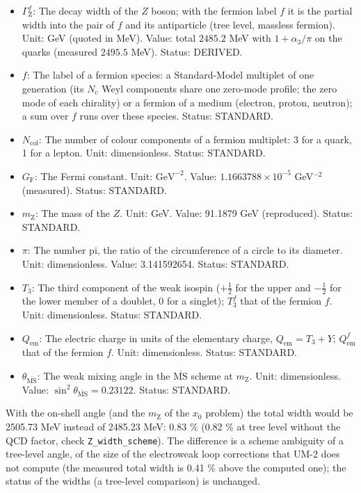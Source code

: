\documentclass[
  10pt,
]{article}
\providecommand{\tightlist}{%
  \setlength{\itemsep}{0pt}\setlength{\parskip}{0pt}}
\begin{document}
\begin{itemize}
\tightlist
\item
  \(\Gamma_{\mathrm{Z}}^{f}\): The decay width of the \(Z\) boson; with
  the fermion label \(f\) it is the partial width into the pair of \(f\)
  and its antiparticle (tree level, massless fermion). Unit: GeV (quoted
  in MeV). Value: total \(2485.2\) MeV with \(1 + \alpha_3/\pi\) on the
  quarks (measured \(2495.5\) MeV). Status: DERIVED.
\item
  \(f\): The label of a fermion species: a Standard-Model multiplet of
  one generation (its \(N_{\mathrm{c}}\) Weyl components share one
  zero-mode profile; the zero mode of each chirality) or a fermion of a
  medium (electron, proton, neutron); a sum over \(f\) runs over these
  species. Status: STANDARD.
\item
  \(N_{\mathrm{col}}\): The number of colour components of a fermion
  multiplet: 3 for a quark, 1 for a lepton. Unit: dimensionless. Status:
  STANDARD.
\item
  \(G_{\mathrm{F}}\): The Fermi constant. Unit: \(\mathrm{GeV}^{-2}\).
  Value: \(1.1663788\times10^{-5}\) GeV\(^{-2}\) (measured). Status:
  STANDARD.
\item
  \(m_{\mathrm{Z}}\): The mass of the \(Z\). Unit: GeV. Value: 91.1879
  GeV (reproduced). Status: STANDARD.
\item
  \(\pi\): The number pi, the ratio of the circumference of a circle to
  its diameter. Unit: dimensionless. Value: 3.141592654. Status:
  STANDARD.
\item
  \(T_3\): The third component of the weak isospin (\(+\frac12\) for the
  upper and \(-\frac12\) for the lower member of a doublet, 0 for a
  singlet); \(T_3^f\) that of the fermion \(f\). Unit: dimensionless.
  Status: STANDARD.
\item
  \(Q_{\mathrm{em}}\): The electric charge in units of the elementary
  charge, \(Q_{\mathrm{em}} = T_3 + Y\); \(Q^f_{\mathrm{em}}\) that of
  the fermion \(f\). Unit: dimensionless. Status: STANDARD.
\item
  \(\theta_{\overline{\mathrm{MS}}}\): The weak mixing angle in the
  \(\overline{\mathrm{MS}}\) scheme at \(m_{\mathrm{Z}}\). Unit:
  dimensionless. Value:
  \(\sin^2\theta_{\overline{\mathrm{MS}}} = 0.23122\). Status: STANDARD.
\end{itemize}

With the on-shell angle (and the \(m_{\mathrm{Z}}\) of the \(x_0\)
problem) the total width would be 2505.73 MeV instead of 2485.23 MeV:
\(0.83\) \% (0.82 \% at tree level without the QCD factor, check
\texttt{Z\_width\_scheme}). The difference is a scheme ambiguity of a
tree-level angle, of the size of the electroweak loop corrections that
UM-2 does not compute (the measured total width is 0.41 \% above the
computed one); the status of the widths (a tree-level comparison) is
unchanged.
\end{document}
